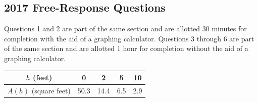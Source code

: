 \subsection{2017 Free-Response Questions}
Questions 1 and 2 are part of the same section and are allotted 30 minutes for completion with the aid of a graphing calculator.
Questions 3 through 6 are part of the same section and are allotted 1 hour for completion without the aid of a graphing calculator.

\begin{table}[H]
	\begin{center}
		\begin{tabular}{|c||c|c|c|c|}
			\hline
			$h$ (feet) & 0 & 2 & 5 & 10 \\
			\hline
			$A(h)$ (square feet) & 50.3 & 14.4 & 6.5 & 2.9 \\
			\hline
		\end{tabular}
	\end{center}
\end{table}

